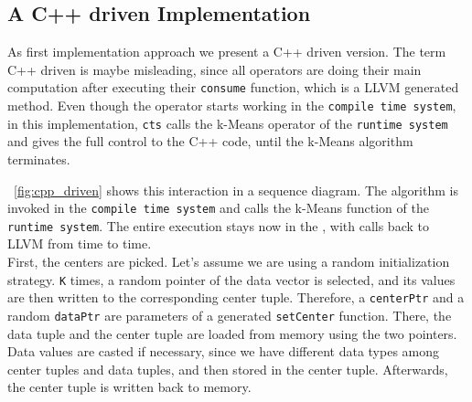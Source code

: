 \subsection{A C++ driven Implementation}

As first implementation approach we present a C++ driven version. The term C++ driven is maybe misleading, since all operators are doing their main computation after executing their \texttt{consume} function, which is a LLVM generated method. Even though the operator starts working in the \texttt{compile time system}, in this implementation, \texttt{cts} calls the k-Means operator of the \texttt{runtime system} and gives the full control to the C++ code, until the k-Means algorithm terminates. 

~\autoref{fig:cpp_driven} shows this interaction in a sequence diagram. The algorithm is invoked in the \texttt{compile time system} and calls the k-Means function of the \texttt{runtime system}. The entire execution stays now in the , with calls back to LLVM from time to time. 
\\
First, the centers are picked. Let’s assume we are using a random initialization strategy. \texttt{K} times, a random pointer of the data vector is selected, and its values are then written to the corresponding center tuple. Therefore, a \texttt{centerPtr} and a random \texttt{dataPtr} are parameters of a generated \texttt{setCenter} function. There, the data tuple and the center tuple are loaded from memory using the two pointers. Data values are casted if necessary, since we have different data types among center tuples and data tuples, and then stored in the center tuple. Afterwards, the center tuple is written back to memory.

